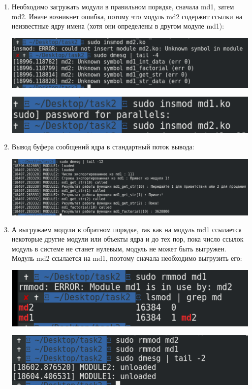 \documentclass[a4paper,14pt]{extreport} %
\begin{document}
\begin{enumerate}

\item Необходимо загружать модули в правильном порядке, сначала md1, затем md2. Иначе возникнет ошибка, потому что модуль md2 содержит ссылки на неизвестные ядру имена (хотя они определены в другом модуле md1):

\includegraphics[scale=0.6]{8}

\includegraphics[scale=0.6]{3}

\item Вывод буфера сообщений ядра в стандартный поток вывода:

\includegraphics[scale=0.45]{4}

\item А выгружаем модули в обратном порядке, так как на модуль md1 ссылается некоторые другие модули или объекты ядра и до тех пор, пока число ссылок модуль в системе не станет нулевым, модуль не может быть выгружен. Модуль md2 ссылается на md1, поэтому сначала необходимо выгрузить его:

\includegraphics[scale=0.6]{7}

\includegraphics[scale=0.6]{5}


\end{enumerate}
\end{document}
